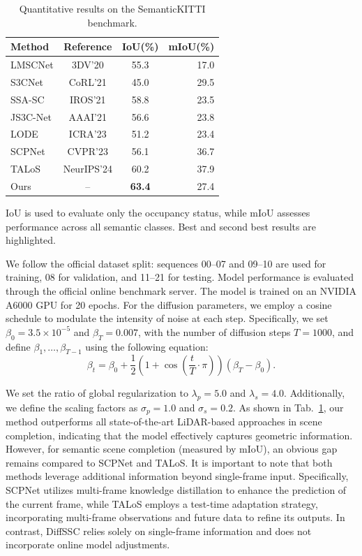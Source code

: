 \documentclass[conference]{IEEEtran}
\begin{document}
\begin{table}[htbp]
  \centering
  \caption{Quantitative results on the SemanticKITTI benchmark.}
  \label{tab:kitti}
  \begin{tabular}{lccr}
    \toprule
    Method & Reference & IoU(\%) & mIoU(\%) \\
    \midrule
    LMSCNet \cite{lroldao2020}   & 3DV'20     & 55.3 & 17.0 \\
    S3CNet \cite{rcheng2024}   & CoRL'21    & 45.0 & 29.5 \\
    SSA-SC \cite{xyang2025}   & IROS'21    & 58.8 & 23.5 \\
    JS3C-Net \cite{xyan} & AAAI'21    & 56.6 & 23.8 \\
    LODE \cite{pli2022}     & ICRA'23    & 51.2 & 23.4 \\
    SCPNet \cite{zxia2024}   & CVPR'23    & 56.1 & 36.7 \\
    TALoS \cite{hjang2025}    & NeurIPS'24 & 60.2 & 37.9 \\
    \midrule
    Ours          & --         & \textbf{63.4} & 27.4 \\
    \bottomrule
  \end{tabular}

  \smallskip
  \footnotesize{IoU is used to evaluate only the occupancy status, while mIoU assesses performance across all semantic classes. Best and second best results are highlighted.}
\end{table}

We follow the official dataset split: sequences 00--07 and 09--10 are used for training, 08 for validation, and 11--21 for testing.
Model performance is evaluated through the official online benchmark server.
The model is trained on an NVIDIA A6000 GPU for 20 epochs.
For the diffusion parameters, we employ a cosine schedule to modulate the intensity of noise at each step.
Specifically, we set $\beta_0 = 3.5 \times 10^{-5}$ and $\beta_T = 0.007$, with the number of diffusion steps $T = 1000$, and define $\beta_1, \ldots, \beta_{T-1}$ using the following equation:
\begin{equation}
  \beta_t = \beta_0 + \frac{1}{2}\left(1 + \cos\!\left(\frac{t}{T} \cdot \pi\right)\right)(\beta_T - \beta_0).
  \label{eq:cosine}
\end{equation}

We set the ratio of global regularization to $\lambda_p = 5.0$ and $\lambda_s = 4.0$.
Additionally, we define the scaling factors as $\sigma_p = 1.0$ and $\sigma_s = 0.2$.
As shown in Tab.~\ref{tab:kitti}, our method outperforms all state-of-the-art LiDAR-based approaches in scene completion, indicating that the model effectively captures geometric information.
However, for semantic scene completion (measured by mIoU), an obvious gap remains compared to SCPNet and TALoS.
It is important to note that both methods leverage additional information beyond single-frame input.
Specifically, SCPNet utilizes multi-frame knowledge distillation to enhance the prediction of the current frame, while TALoS employs a test-time adaptation strategy, incorporating multi-frame observations and future data to refine its outputs.
In contrast, DiffSSC relies solely on single-frame information and does not incorporate online model adjustments.
\end{document}
